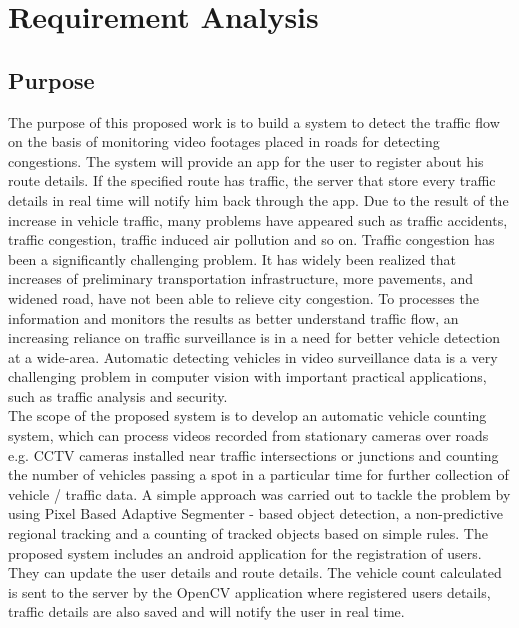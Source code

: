 \chapter{Requirement Analysis}

\section{Purpose}
	
	\par The purpose of this proposed work is to build a system to detect the traffic flow on the basis of monitoring video footages placed in roads for detecting congestions. The system will provide an app for the user to register about his route details. If the specified route has traffic, the server that store every traffic details in real time will notify him back through the app. Due to the result of the increase in vehicle traffic, many problems have appeared such as traffic accidents, traffic congestion, traffic induced air pollution and so on. Traffic congestion has been a significantly challenging problem. It has widely been realized that increases of preliminary transportation infrastructure, more pavements, and widened road, have not been able to relieve city congestion. To processes the information and monitors the results as better understand traffic flow, an increasing reliance on traffic surveillance is in a need for better vehicle detection at a wide-area. Automatic detecting vehicles in video surveillance data is a very challenging problem in computer vision with important practical applications, such as traffic analysis and security.\\
	
	The scope of the proposed system is to develop an automatic vehicle counting system, which can process videos recorded from stationary cameras over roads e.g. CCTV cameras installed near traffic intersections or junctions and counting the number of vehicles passing a spot in a particular time for further collection of vehicle / traffic data. A simple approach was carried out to tackle the problem by using Pixel Based Adaptive Segmenter - based object detection, a non-predictive regional tracking and a counting of tracked objects based on simple rules. The proposed system includes an android application for the registration of users. They can update the user details and route details. The vehicle count calculated is sent to the server by the OpenCV application where registered users details, traffic details are also saved and will notify the user in real time.\\
\\
\\
